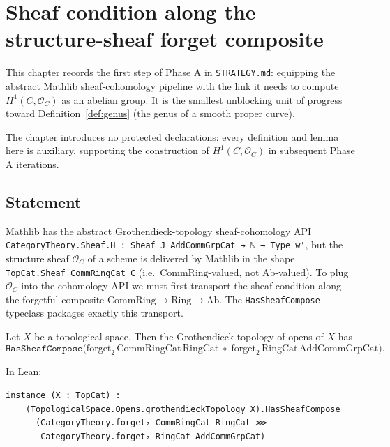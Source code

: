 \chapter{Sheaf condition along the structure-sheaf forget composite}
\label{chap:Cohomology_SheafCompose}

This chapter records the first step of Phase A in \texttt{STRATEGY.md}: equipping the abstract Mathlib sheaf-cohomology pipeline with the link it needs to compute $H^1(C, \mathcal O_C)$ as an abelian group. It is the smallest unblocking unit of progress toward Definition~\ref{def:genus} (the genus of a smooth proper curve).

The chapter introduces no protected declarations: every definition and lemma here is auxiliary, supporting the construction of $H^1(C, \mathcal O_C)$ in subsequent Phase A iterations.

\section{Statement}

Mathlib has the abstract Grothendieck-topology sheaf-cohomology API
\lstinline{CategoryTheory.Sheaf.H : Sheaf J AddCommGrpCat → ℕ → Type w'}, but the structure sheaf $\mathcal O_C$ of a scheme is delivered by Mathlib in the shape \lstinline{TopCat.Sheaf CommRingCat C} (i.e.\ $\mathrm{CommRing}$-valued, not $\mathrm{Ab}$-valued). To plug $\mathcal O_C$ into the cohomology API we must first transport the sheaf condition along the forgetful composite $\mathrm{CommRing} \to \mathrm{Ring} \to \mathrm{Ab}$. The \lstinline{HasSheafCompose} typeclass packages exactly this transport.

\begin{theorem}
  \label{thm:HasSheafCompose_forget}
  \leanok
  Let $X$ be a topological space. Then the Grothendieck topology of opens of $X$ has
  \[
    \mathtt{HasSheafCompose}\bigl(
      \mathrm{forget}_2\, \mathrm{CommRingCat}\, \mathrm{RingCat} \;\circ\;
      \mathrm{forget}_2\, \mathrm{RingCat}\, \mathrm{AddCommGrpCat}
    \bigr).
  \]
\end{theorem}

In Lean:
\begin{lstlisting}
instance (X : TopCat) :
    (TopologicalSpace.Opens.grothendieckTopology X).HasSheafCompose
      (CategoryTheory.forget₂ CommRingCat RingCat ⋙
       CategoryTheory.forget₂ RingCat AddCommGrpCat)
\end{lstlisting}

